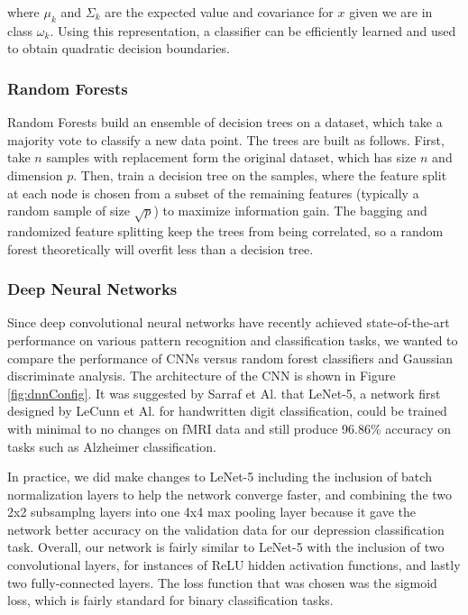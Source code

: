 \documentclass{article}[12pt]
\begin{document}
   where $\mu_k$ and $\Sigma_k$ are the expected value and covariance for $x$ given we are in class $\omega_k$. Using this representation, a classifier can be efficiently learned and used to obtain quadratic decision boundaries.
   
   
   \subsubsection{Random Forests}
   Random Forests build an ensemble of decision trees on a dataset, which take a majority vote to classify a new data point. The trees are built as follows.  First, take $n$ samples with replacement form the original dataset, which has size $n$ and dimension $p$.  Then, train a decision tree on the samples, where the feature split at each node is chosen from a subset of the remaining features (typically a random sample of size $\sqrt{p}$) to maximize information gain.  The bagging and randomized feature splitting keep the trees from being correlated, so a random forest theoretically will overfit less than a decision tree.
   
   \subsubsection{Deep Neural Networks}
   Since deep convolutional neural networks have recently achieved state-of-the-art performance on various pattern recognition and classification tasks, we wanted to compare the performance of CNNs versus random forest classifiers and Gaussian discriminate analysis. The architecture of the CNN is shown in Figure \ref{fig:dnnConfig}.  It was suggested by Sarraf et Al. \cite{sarraf2016fmri} that LeNet-5, a network first designed by LeCunn et Al. \cite{lecun1998gradient} for handwritten digit classification, could be trained with minimal to no changes on fMRI data and still produce 96.86\% accuracy on tasks such as Alzheimer classification. 
   
   In practice, we did make changes to LeNet-5 including the inclusion of batch normalization layers to help the network converge faster, and combining the two 2x2 subsamplng layers into one 4x4 max pooling layer because it gave the network better accuracy on the validation data for our depression classification task. Overall, our network is fairly similar to LeNet-5 with the inclusion of two convolutional layers, for instances of ReLU hidden activation functions, and lastly two fully-connected layers. The loss function that was chosen was the sigmoid loss, which is fairly standard for binary classification tasks.  
   
\end{document}

